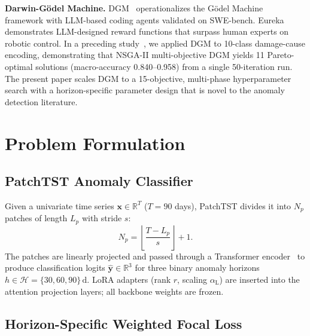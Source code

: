 ﻿\documentclass[twocolumn]{article}
\begin{document}
\textbf{Darwin-G\"{o}del Machine.}
DGM~\cite{liu2025dgm} operationalizes the G\"{o}del
Machine~\cite{schmidhuber2003goedel} framework with LLM-based
coding agents validated on SWE-bench.
Eureka~\cite{ma2024eureka} demonstrates LLM-designed reward
functions that surpass human experts on robotic control.
In a preceding study~\cite{yasuno2026dgm}, we applied DGM to
10-class damage-cause encoding, demonstrating that NSGA-II
multi-objective DGM yields 11 Pareto-optimal solutions
(macro-accuracy 0.840--0.958) from a single 50-iteration run.
The present paper scales DGM to a 15-objective, multi-phase
hyperparameter search with a horizon-specific parameter design
that is novel to the anomaly detection literature.

\section{Problem Formulation}
\label{sec:problem}

\subsection{PatchTST Anomaly Classifier}

Given a univariate time series $\mathbf{x} \in \mathbb{R}^{T}$
($T{=}90$ days), PatchTST divides it into $N_p$ patches of length
$L_p$ with stride $s$:
\begin{equation}
  N_p = \left\lfloor\frac{T - L_p}{s}\right\rfloor + 1.
  \label{eq:npatch}
\end{equation}
The patches are linearly projected and passed through a Transformer
encoder~\cite{vaswani2017attention} to produce classification logits
$\hat{\mathbf{y}} \in \mathbb{R}^3$
for three binary anomaly horizons $h\in\mathcal{H}=\{30,60,90\}\,\mathrm{d}$.
LoRA adapters (rank $r$, scaling $\alpha_\text{L}$) are inserted
into the attention projection layers; all backbone weights are frozen.

\subsection{Horizon-Specific Weighted Focal Loss}
\end{document}
